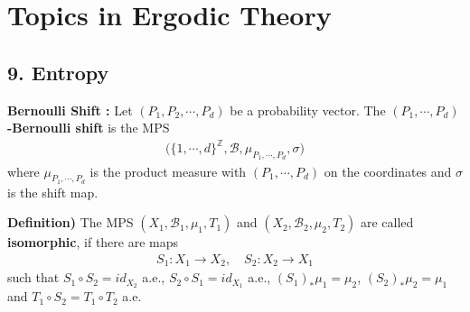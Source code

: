 \documentclass[10pt,a4paper]{report}
\DeclarePairedDelimiter\bignorm{\lVert}{\rVert}
\begin{document}
\newcommand{\thm}{\textbf{Theorem) }}
\newcommand{\thmnum}[1]{\textbf{Theorem #1) }}
\newcommand{\defi}{\textbf{Definition) }}
\newcommand{\lem}{\textbf{Lemma) }}
\newcommand{\lemnum}[1]{\textbf{Lemma #1) }}
\newcommand{\prop}{\textbf{Proposition) }}
\newcommand{\pf}{\textbf{proof) }}
\newcommand{\cor}{\textbf{Corollary) }}
\newcommand{\cornum}[1]{\textbf{Corollary #1) }}

\newcommand{\lap}{\triangle} %
\newcommand{\s}{\vspace{10pt}}
\newcommand{\bull}{$\bullet$}
\newcommand{\sta}{$\star$}
\newcommand{\reals}{\mathbb{R}}

\newcommand{\eop}{\hfill  \textsl{(End of proof)} $\square$} %

\newcommand{\intN}{\mathbb{Z}_N}
\newcommand{\norms}[2]{\bignorm[\big]{#1}_{#2}}
\newcommand{\abs}[1]{\big| #1 \big|}
\newcommand{\avg}{\mathbb{E}}
\newcommand{\borel}{\mathscr{B}}
\newcommand{\setlimsup}[2]{\bigcap_{#1=1}^{\infty}\bigcup_{#2=#1}^{\infty}}
\newcommand{\dlim}{D-\lim}
\newcommand{\clim}{C-\lim}

\newcommand{\newday}{======================================================================}
\newcommand{\digression}{**********************************************************************************************}

\setlength\parindent{0pt}
\noindent

\chapter*{Topics in Ergodic Theory}
\s

\section*{9. Entropy}

\textbf{Bernoulli Shift : } Let $(P_1, P_2,\cdots, P_d)$ be a probability vector. The \textbf{$(P_1, \cdots, P_d)$-Bernoulli shift} is the MPS
\begin{align*}
\big( \{1,\cdots, d\}^{\mathbb{Z}}, \borel, \mu_{P_1,\cdots, P_d},\sigma \big)
\end{align*}
where $\mu_{P_1,\cdots, P_d}$ is the product measure with $(P_1,\cdots, P_d)$ on the coordinates and $\sigma$ is the shift map.
\s

\defi The MPS $(X_1, \borel_1, \mu_1, T_1)$ and $(X_2,\borel_2, \mu_2, T_2)$ are called \textbf{isomorphic}, if there are maps
\begin{align*}
S_1 : X_1\rightarrow X_2,\quad S_2 : X_2 \rightarrow X_1
\end{align*}
such that $S_1 \circ S_2 = id_{X_2}$ a.e., $S_2 \circ S_1 = id_{X_1}$ a.e., $(S_1)_* \mu_1 =\mu_2$, $(S_2)_* \mu_2 =\mu_1$ and $T_1 \circ S_2 = T_1 \circ T_2$ a.e.
\s
\end{document}
